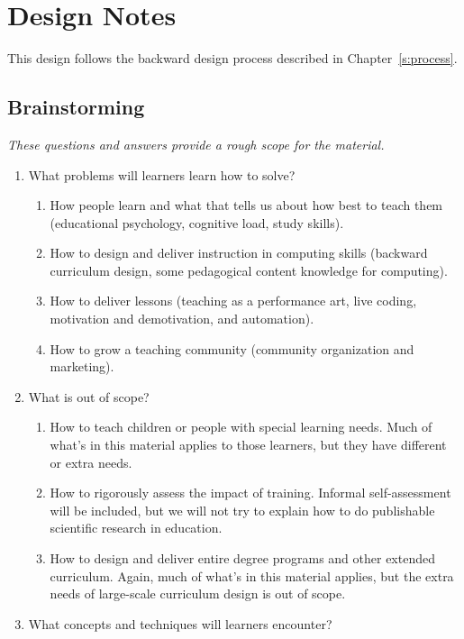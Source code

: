 \chapter{Design Notes}\label{s:v3}

This design follows the backward design process described in
Chapter~\ref{s:process}.

\section{Brainstorming}\label{brainstorming}

\emph{These questions and answers provide a rough scope for the material.}

\begin{enumerate}
\item
  What problems will learners learn how to solve?

  \begin{enumerate}
  \item
    How people learn and what that tells us about how best to teach
    them (educational psychology, cognitive load, study skills).
  \item
    How to design and deliver instruction in computing skills
    (backward curriculum design, some pedagogical content knowledge
    for computing).
  \item
    How to deliver lessons (teaching as a performance art, live
    coding, motivation and demotivation, and automation).
  \item
    How to grow a teaching community (community organization and
    marketing).
  \end{enumerate}
\item
  What is out of scope?

  \begin{enumerate}
  \item
    How to teach children or people with special learning needs.
    Much of what's in this material applies to those learners, but
    they have different or extra needs.
  \item
    How to rigorously assess the impact of training. Informal
    self-assessment will be included, but we will not try to explain
    how to do publishable scientific research in education.
  \item
    How to design and deliver entire degree programs and other
    extended curriculum. Again, much of what's in this material
    applies, but the extra needs of large-scale curriculum design is
    out of scope.
  \end{enumerate}
\item
  What concepts and techniques will learners encounter?


\end{enumerate}

